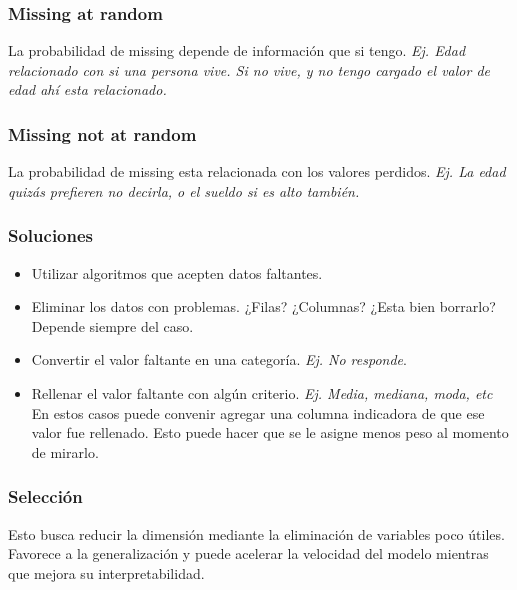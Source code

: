 \documentclass[titlepage,a4paper]{article}
\begin{document}
\subsubsection*{Missing at random}
La probabilidad de missing depende de información que si tengo. \textit{Ej. Edad relacionado con si una persona vive. Si no vive, y no tengo cargado el valor de edad ahí esta relacionado.}

\subsubsection*{Missing not at random}
La probabilidad de missing esta relacionada con los valores perdidos. \textit{Ej. La edad quizás prefieren no decirla, o el sueldo si es alto también.}

\subsubsection*{Soluciones}
\begin{itemize}
    \item Utilizar algoritmos que acepten datos faltantes.
    \item Eliminar los datos con problemas. ¿Filas? ¿Columnas? ¿Esta bien borrarlo? Depende siempre del caso.
    \item Convertir el valor faltante en una categoría. \textit{Ej. No responde}.
    \item Rellenar el valor faltante con algún criterio. \textit{Ej. Media, mediana, moda, etc} En estos casos puede convenir agregar una columna indicadora de que ese valor fue rellenado. Esto puede hacer que se le asigne menos peso al momento de mirarlo.
\end{itemize}

\subsubsection{Selección}
Esto busca reducir la dimensión mediante la eliminación de variables poco útiles. Favorece a la generalización y puede acelerar la velocidad del modelo mientras que mejora su interpretabilidad.
\end{document}
